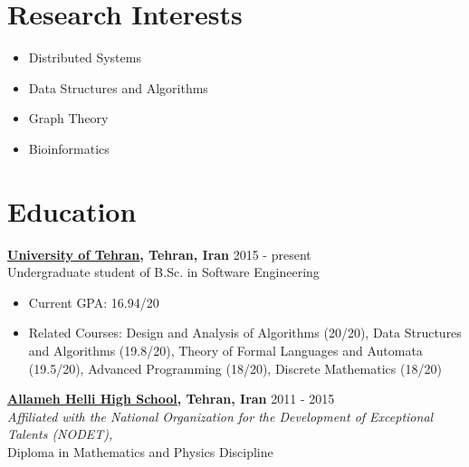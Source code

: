 \documentclass[margin]{res}
\begin{document}
 
 
 
\address{No. 14, Tanhajou Street, \\Tehranpars 3rd Square, \\Tehran, Iran, 1653984753}
\address{Cell: +98-919-6421171 \\ \href{mailto:shayan.hosseini@ut.ac.ir}{\texttt{shayan.hosseini@ut.ac.ir}} \\ 
		\href{http://www.shayanh.ir}{\texttt{http://www.shayanh.ir}}}

 
\begin{resume}

\section{Research Interests}
\begin{itemize}[leftmargin=0mm]
	\item Distributed Systems
	\item Data Structures and Algorithms
	\item Graph Theory
	\item Bioinformatics
\end{itemize}

\section{Education}
    {\bf \href{http://ut.ac.ir/en}{University of Tehran}, Tehran, Iran} \hfill 2015 - present
    \\Undergraduate student of B.Sc. in Software Engineering
    
   	\begin{itemize}
	\item Current GPA: 16.94/20
	\item Related Courses: Design and Analysis of Algorithms (20/20), Data Structures and Algorithms (19.8/20),
	Theory of Formal Languages and Automata (19.5/20), Advanced Programming (18/20), Discrete Mathematics (18/20)
	\end{itemize}

    {\bf \href{http://www.helli.ir/}{Allameh Helli High School}, Tehran, Iran} \hfill 2011 - 2015
    \\\textit{\scriptsize Affiliated with the National Organization for the Development of Exceptional Talents (NODET),}
    \\Diploma in Mathematics and Physics Discipline


\end{resume}
\end{document}
